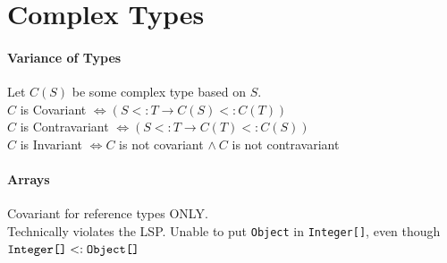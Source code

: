 \section{Complex Types}
\paragraph{Variance of Types}
Let $C(S)$ be some complex type based on $S$.\\
$C$ is Covariant $\iff (S<:T \rightarrow C(S)<:C(T))$\\
$C$ is Contravariant $\iff (S<:T \rightarrow C(T)<:C(S))$\\
$C$ is Invariant $\iff C$ is not covariant $\wedge\ C$ is not contravariant
\paragraph{Arrays}
Covariant for reference types \textcolor{Bittersweet}{ONLY}.\\
Technically violates the LSP\@. Unable to put \verb|Object| in \verb|Integer[]|,
even though $\verb|Integer[]|<:\verb|Object[]|$
